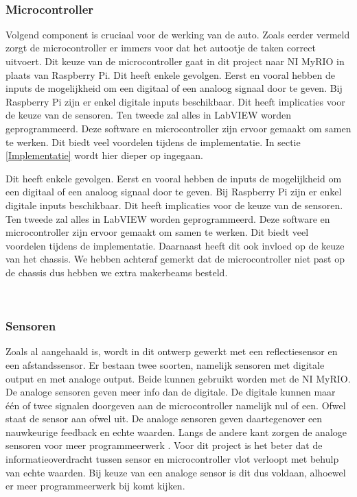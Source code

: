 \documentclass[a4paper,twoside,kulak]{kulakreport} %
\begin{document}
~
\subsubsection{Microcontroller}

Volgend component is cruciaal voor de werking van de auto. Zoals eerder vermeld zorgt de microcontroller er immers voor dat het autootje de taken correct uitvoert. Dit keuze van de microcontroller gaat in dit project naar NI MyRIO in plaats van Raspberry Pi. Dit heeft enkele gevolgen. 
Eerst en vooral hebben de inputs de mogelijkheid om een digitaal of een analoog signaal door te geven. Bij Raspberry Pi zijn er enkel digitale inputs beschikbaar. Dit heeft implicaties voor de keuze van de sensoren. Ten tweede zal alles in LabVIEW worden geprogrammeerd. Deze software en microcontroller zijn ervoor gemaakt om samen te werken. Dit biedt veel voordelen tijdens de implementatie. In sectie \ref{Implementatie} wordt hier dieper op ingegaan. %


Dit heeft enkele gevolgen.
Eerst en vooral hebben de inputs de mogelijkheid om een digitaal of een analoog signaal door te geven. Bij Raspberry Pi zijn er enkel digitale inputs beschikbaar. Dit heeft implicaties voor de keuze van de sensoren. Ten tweede zal alles in LabVIEW worden geprogrammeerd. Deze software en microcontroller zijn ervoor gemaakt om samen te werken. Dit biedt veel voordelen tijdens de implementatie. Daarnaast heeft dit ook invloed op de keuze van het chassis. We hebben achteraf gemerkt dat de microcontroller niet past op de chassis dus hebben we extra makerbeams besteld.

\label{Microcontroller}
~
\subsubsection{Sensoren}
Zoals al aangehaald is, wordt in dit ontwerp gewerkt met een reflectiesensor en een afstandssensor. Er bestaan twee soorten, namelijk sensoren met digitale output en met analoge output. Beide kunnen gebruikt worden met de NI MyRIO. De analoge sensoren geven meer info dan de digitale. De digitale kunnen maar één of twee signalen doorgeven aan de microcontroller namelijk nul of een. Ofwel staat de sensor aan ofwel uit. De analoge sensoren geven daartegenover een nauwkeurige feedback en echte waarden. Langs de andere kant zorgen de analoge sensoren voor meer programmeerwerk \cite{DigitaalOfAnaloog}. Voor dit project is het beter dat de informatieoverdracht tussen sensor en microcontroller vlot verloopt met behulp van echte waarden. Bij keuze van een analoge sensor is dit dus voldaan, alhoewel er meer programmeerwerk bij komt kijken. %
\end{document}
